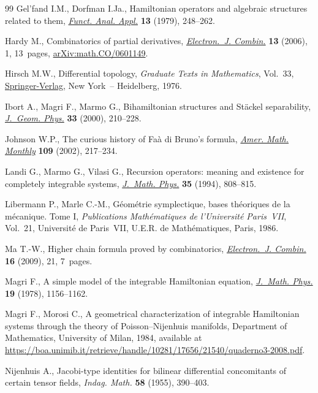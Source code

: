 \documentclass[10pt,a4paper]{amsart}
\numberwithin{equation}{section}
\begin{document}
\begin{thebibliography}{99}
Gel'fand I.M., Dorfman I.Ja., Hamiltonian operators and algebraic structures
 related to them, \href{https://doi.org/10.1007/BF01078363}{\textit{Funct. Anal. Appl.}} \textbf{13} (1979), 248--262.

Hardy M., Combinatorics of partial derivatives, \href{https://doi.org/10.37236/1027}{\textit{Electron.~J. Combin.}}
 \textbf{13} (2006), 1, 13~pages, \href{https://arxiv.org/abs/math.CO/0601149}{arXiv:math.CO/0601149}.

Hirsch M.W., Differential topology, \textit{Graduate Texts in Mathematics},
 Vol.~33, \href{https://doi.org/10.1007/978-1-4684-9449-5}{Springer-Verlag}, New York~-- Heidelberg, 1976.

Ibort A., Magri F., Marmo G., Bihamiltonian structures and {S}t\"ackel
 separability, \href{https://doi.org/10.1016/S0393-0440(99)00051-0}{\textit{J.~Geom. Phys.}} \textbf{33} (2000), 210--228.

Johnson W.P., The curious history of {F}a\`a di {B}runo's formula,
 \href{https://doi.org/10.2307/2695352}{\textit{Amer. Math. Monthly}} \textbf{109} (2002), 217--234.

Landi G., Marmo G., Vilasi G., Recursion operators: meaning and existence for
 completely integrable systems, \href{https://doi.org/10.1063/1.530613}{\textit{J.~Math. Phys.}} \textbf{35} (1994),
 808--815.

Libermann P., Marle C.-M., G\'eom\'etrie symplectique, bases th\'eoriques de la
 m\'ecanique. {T}ome {I}, \textit{Publications Math\'ematiques de
 l'Universit\'e Paris~VII}, Vol.~21, Universit\'e de Paris~VII, U.E.R. de
 Math\'ematiques, Paris, 1986.

Ma T.-W., Higher chain formula proved by combinatorics, \href{https://doi.org/10.37236/259}{\textit{Electron.~J.
 Combin.}} \textbf{16} (2009), 21, 7~pages.

Magri F., A simple model of the integrable {H}amiltonian equation,
 \href{https://doi.org/10.1063/1.523777}{\textit{J.~Math. Phys.}} \textbf{19} (1978), 1156--1162.

Magri F., Morosi C., A geometrical characterization of integrable {H}amiltonian
 systems through the theory of {P}oisson--{N}ijenhuis manifolds, {D}epartment
 of Mathematics, University of Milan, 1984, available at
 \url{https://boa.unimib.it/retrieve/handle/10281/17656/21540/quaderno3-2008.pdf}.

Nijenhuis A., Jacobi-type identities for bilinear differential concomitants of
 certain tensor fields, \textit{Indag. Math.} \textbf{58} (1955), 390--403.


\end{thebibliography}
\end{document}
